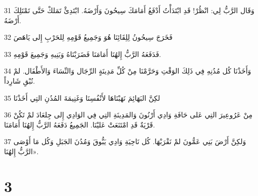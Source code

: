 \par 31 وَقَال الرَّبُّ لِي: انْظُرْ! قَدِ ابْتَدَأْتُ أَدْفَعُ أَمَامَكَ سِيحُونَ وَأَرْضَهُ. ابْتَدِئْ تَمَلكْ حَتَّى تَمْتَلِكَ أَرْضَهُ.
\par 32 فَخَرَجَ سِيحُونُ لِلِقَائِنَا هُوَ وَجَمِيعُ قَوْمِهِ لِلحَرْبِ إِلى يَاهَصَ
\par 33 فَدَفَعَهُ الرَّبُّ إِلهُنَا أَمَامَنَا فَضَرَبْنَاهُ وَبَنِيهِ وَجَمِيعَ قَوْمِهِ.
\par 34 وَأَخَذْنَا كُل مُدُنِهِ فِي ذَلِكَ الوَقْتِ وَحَرَّمْنَا مِنْ كُلِّ مَدِينَةٍ الرِّجَال وَالنِّسَاءَ وَالأَطْفَال. لمْ نُبْقِ شَارِداً.
\par 35 لكِنَّ البَهَائِمَ نَهَبْنَاهَا لأَنْفُسِنَا وَغَنِيمَةَ المُدُنِ التِي أَخَذْنَا
\par 36 مِنْ عَرُوعِيرَ التِي عَلى حَافَةِ وَادِي أَرْنُونَ وَالمَدِينَةِ التِي فِي الوَادِي إِلى جِلعَادَ لمْ تَكُنْ قَرْيَةٌ قَدِ امْتَنَعَتْ عَليْنَا. الجَمِيعُ دَفَعَهُ الرَّبُّ إِلهُنَا أَمَامَنَا.
\par 37 وَلكِنَّ أَرْضَ بَنِي عَمُّونَ لمْ نَقْرَبْهَا. كُل نَاحِيَةِ وَادِي يَبُّوقَ وَمُدُنَ الجَبَلِ وَكُل مَا أَوْصَى الرَّبُّ إِلهُنَا».

\chapter{3}

